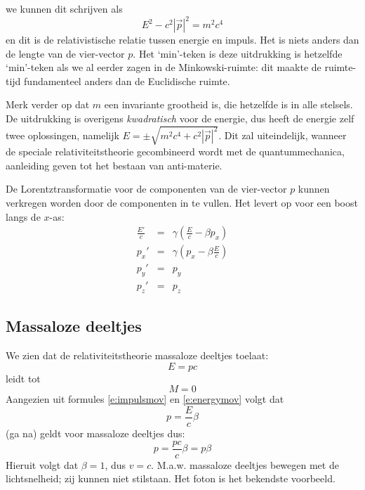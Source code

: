 we kunnen dit schrijven als
\begin{equation}
E^2 - c^2 |\vec{p}|^2 = m^2 c^4
\end{equation}
en dit is de relativistische relatie tussen energie en impuls. Het is
niets anders dan de lengte van de vier-vector $p$. Het `min'-teken is
deze uitdrukking is hetzelfde `min'-teken als we al eerder zagen in de
Minkowski-ruimte: dit maakte de ruimte-tijd fundamenteel anders dan de
Euclidische ruimte.

Merk verder op dat $m$ een invariante grootheid is, die hetzelfde is in alle stelsels. De uitdrukking is
overigens {\it kwadratisch} voor de energie, dus heeft de energie zelf twee oplossingen, namelijk $E=\pm 
\sqrt{m^2 c^4 + c^2 |\vec{p}|^2}$. Dit zal uiteindelijk, wanneer de speciale relativiteitstheorie gecombineerd wordt met de quantummechanica, aanleiding geven tot het bestaan van anti-materie.

De Lorentztransformatie voor de componenten van de vier-vector $p$ kunnen verkregen worden door de componenten in te vullen. Het levert op voor een boost langs de $x$-as:
\begin{eqnarray}
\frac{E'}{c} &=& \gamma\left(\frac{E}{c} - \beta p_x \right) \\
p_x' & = & \gamma\left( p_x - \beta \frac{E}{c}\right) \\
p_y' & = & p_y \\
p_z' & = & p_z
\end{eqnarray}


\subsection{Massaloze deeltjes}
We zien dat de relativiteitstheorie massaloze deeltjes toelaat:
\begin{displaymath}
E = pc
\end{displaymath}
leidt tot
\begin{displaymath}
M = 0
\end{displaymath}
Aangezien uit formules \ref{e:impulsmov} en \ref{e:energymov} volgt dat
\begin{displaymath}
p = \frac{E}{c} \beta 
\end{displaymath}
(ga na) geldt voor massaloze deeltjes dus:
\begin{displaymath}
p = \frac{pc}{c} \beta = p \beta
\end{displaymath}
Hieruit volgt dat $\beta = 1$, dus $v = c$.
M.a.w. massaloze deeltjes bewegen met de lichtsnelheid; zij kunnen niet stilstaan. Het foton
is het bekendste voorbeeld. 

